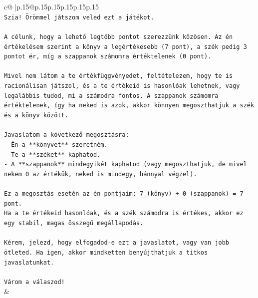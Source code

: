 \documentclass{article}
\begin{document}
{\begin{supertabular}{c@{$\;$}|p{.15\linewidth}@{}p{.15\linewidth}p{.15\linewidth}p{.15\linewidth}p{.15\linewidth}p{.15\linewidth}}
{{{\\ 
\texttt{Szia! Örömmel játszom veled ezt a játékot.} \\
\\ 
\texttt{A célunk, hogy a lehető legtöbb pontot szerezzünk közösen. Az én értékelésem szerint a könyv a legértékesebb (7 pont), a szék pedig 3 pontot ér, míg a szappanok számomra értéktelenek (0 pont).} \\
\\ 
\texttt{Mivel nem látom a te értékfüggvényedet, feltételezem, hogy te is racionálisan játszol, és a te értékeid is hasonlóak lehetnek, vagy legalábbis tudod, mi a számodra fontos. A szappanok számomra értéktelenek, így ha neked is azok, akkor könnyen megoszthatjuk a szék és a könyv között.} \\
\\ 
\texttt{Javaslatom a következő megosztásra:} \\
\texttt{{-} Én a **könyvet** szeretném.} \\
\texttt{{-} Te a **széket** kaphatod.} \\
\texttt{{-} A **szappanok** mindegyikét kaphatod (vagy megoszthatjuk, de mivel nekem 0 az értékük, neked is mindegy, hánnyal végzel).} \\
\\ 
\texttt{Ez a megosztás esetén az én pontjaim: 7 (könyv) + 0 (szappanok) = 7 pont.} \\
\texttt{Ha a te értékeid hasonlóak, és a szék számodra is értékes, akkor ez egy stabil, magas összegű megállapodás.} \\
\\ 
\texttt{Kérem, jelezd, hogy elfogadod{-}e ezt a javaslatot, vagy van jobb ötleted. Ha igen, akkor mindketten benyújthatjuk a titkos javaslatunkat.} \\
\\ 
\texttt{Várom a válaszod!} \\
            }
        }
    }
    & \\ \\


\end{supertabular}}
\end{document}
